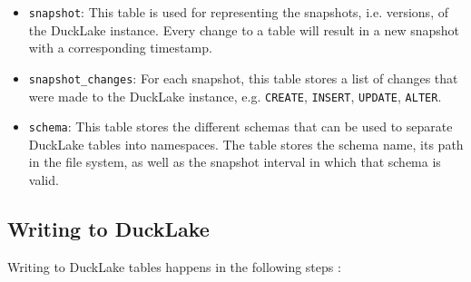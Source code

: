 \begin{itemize}
    \item \verb*|snapshot|: This table is used for representing the snapshots, i.e. versions, of the DuckLake instance. Every change to a table will result in a new snapshot with a corresponding timestamp.

    \item \verb|snapshot_changes|: For each snapshot, this table stores a list of changes that were made to the DuckLake instance, e.g. \verb*|CREATE|, \verb*|INSERT|, \verb*|UPDATE|, \verb*|ALTER|.

    \item \verb|schema|: This table stores the different schemas that can be used to separate DuckLake tables into namespaces. The table stores the schema name, its path in the file system, as well as the snapshot interval in which that schema is valid.
\end{itemize}

%
%
%
%
%

\subsection{Writing to DuckLake}
Writing to DuckLake tables happens in the following steps \cite{mark_raasveldt_ducklake_2025}:


